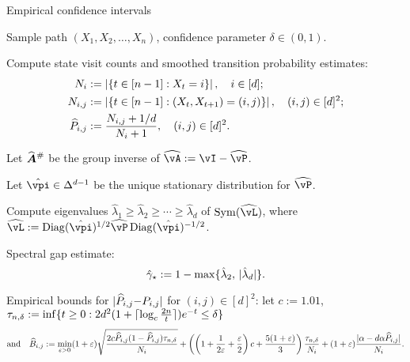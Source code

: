 \begin{algorithm}
\caption{Empirical confidence intervals}
\label{alg:empest}
\begin{algorithmic}[1]
  \renewcommand\algorithmicrequire{\textbf{Input}:}
  \REQUIRE
    Sample path $(X_1,X_2,\dots,X_n)$,
    confidence parameter $\delta \in (0,1)$.

  \STATE Compute state visit counts and smoothed transition
  probability estimates:
  \begin{equation}
    \begin{aligned}
      N_i & :=
      \left|
        \left\{
          t \in [n-1] : X_t = i
        \right\}
      \right|
      , \quad i \in [d] ; \\
      N_{i,j} & :=
      \left|
        \left\{
          t \in [n-1] : (X_t,X_{t+1}) = (i,j)
        \right\}
      \right|
      , \quad (i,j) \in [d]^2 ; \\
      \widehat{P}_{i,j}
      & :=
      \frac{N_{i,j} + 1/d}{N_i + 1}
      , \quad (i,j) \in [d]^2 .
    \end{aligned}
    \notag
  \end{equation}
  \label{step:P}

  \STATE Let $\giAh$ be the group inverse of $\wh\vA := \vI -
  \wh\vP$.
  \label{step:gi}

  \STATE Let $\hat\vpi \in \Delta^{d-1}$ be the unique stationary
  distribution for $\wh\vP$.
  \label{step:pi}

  \STATE Compute eigenvalues $\hat\lambda_1 {\geq} \hat\lambda_2
  {\geq} \dotsb {\geq} \hat\lambda_d$ of $\Sym(\wh\vL)$, where $\wh\vL
  := \Diag(\hat\vpi)^{1/2} \wh\vP \Diag(\hat\vpi)^{-1/2}$.
  \label{step:eig}

  \STATE Spectral gap estimate:
  \[ \hat\gamma_{\star} := 1 - \max\{ \hat\lambda_2,\, |\hat\lambda_d| \} . \]
  \label{step:gap}

  \STATE Empirical bounds for $|\widehat{P}_{i,j}{-}P_{i,j}|$ for $(i,j){\in}[d]^2$:
  let $c:=1.01$,
  $\tau_{n,\delta}
    := \inf
    \{
      t\geq0 :
      2d^2 ( 1 + \lceil\log_c\frac{2n}{t}\rceil ) e^{-t} \leq \delta
    \}$
  \begin{equation}
    \text{and} \quad
    \widehat{B}_{i,j}
    :=
    \min_{\varepsilon>0}
    (1+\varepsilon)
    \sqrt{\frac{2c\widehat{P}_{i,j}(1-\widehat{P}_{i,j})\tau_{n,\delta}}{N_i}}
    +
    \left(
      \left( 1 + \frac1{2\varepsilon} + \frac{\varepsilon}{2} \right)c
      + \frac{5(1+\varepsilon)}{3}
    \right) \frac{\tau_{n,\delta}}{N_i}
    + (1+\varepsilon) \frac{|\alpha-d\alpha\widehat{P}_{i,j}|}{N_i}
    .
    \notag
  \end{equation}
  \label{step:P-bound}


\end{algorithmic}
\end{algorithm}

